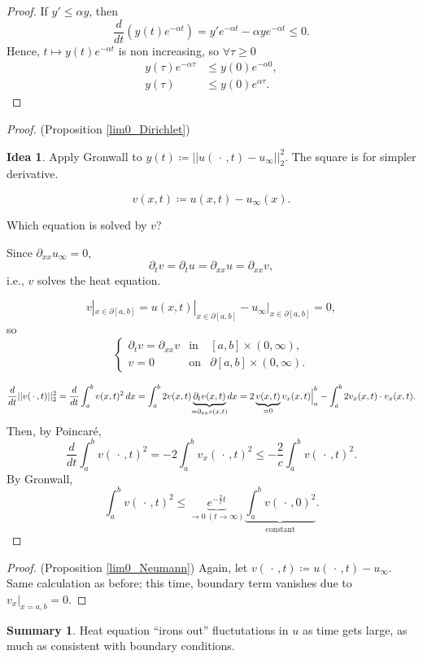 \documentclass[12pt]{article}
\theoremstyle{definition}
\newtheorem*{summary}{Summary}
\newtheorem*{idea}{Idea}
\begin{document}
\begin{proof}
If $y'\leq\alpha y$, then
\[\frac d{dt}(y(t)e^{-\alpha t})=y'e^{-\alpha t}-\alpha ye^{-\alpha t}\leq0.\]
Hence, $t\mapsto y(t)e^{-\alpha t}$ is non increasing, so $\forall\tau\geq0$
\begin{align*}
y(\tau)e^{-\alpha\tau}&\leq y(0)e^{-\alpha0},\\
y(\tau)&\leq y(0)e^{\alpha\tau}.
\end{align*}
\end{proof}

\begin{proof}
(Proposition \ref{lim0_Dirichlet})
\begin{idea}
Apply Gronwall to $y(t)\coloneqq||u(\,\cdot\,,t)-u_\infty||_2^2$. The square is for simpler derivative.
\end{idea}

\[v(x,t)\coloneqq u(x,t)-u_\infty(x).\]

Which equation is solved by $v$?

Since $\partial_{xx}u_\infty=0$,
\[\partial_tv=\partial_tu=\partial_{xx}u=\partial_{xx}v,\]
i.e., $v$ solves the heat equation.

\[v|_{x\in\partial[a,b]}=u(x,t)|_{x\in\partial[a,b]}-u_\infty|_{x\in\partial[a,b]}=0,\]
so
\[\left\{\begin{array}{ccc}\partial_tv=\partial_{xx}v&\text{in}&[a,b]\times(0,\infty),\\v=0&\text{on}&\partial[a,b]\times(0,\infty).\end{array}\right.\]

\[\frac d{dt}||v(\,\cdot\,,t)||_2^2=\frac d{dt}\int_a^bv(x,t)^2\,dx=\int_a^b2v(x,t)\underbrace{\partial_tv(x,t)}_{\mathclap{=\partial_{xx}v(x,t)}}dx=2\underbrace{v(x,t)}_{=0}v_x(x,t)\Big|_{a}^b-\int_a^b2v_x(x,t)\cdot v_x(x,t).\]
Then, by Poincar\'e,
\[\frac d{dt}\int_a^bv(\,\cdot\,,t)^2=-2\int_a^bv_x(\,\cdot\,,t)^2\leq-\frac2c\int_a^bv(\,\cdot\,,t)^2.\]
By Gronwall,
\[\int_a^bv(\,\cdot\,,t)^2\leq \underbrace{e^{-\frac2ct}}_{\to0\ (t\to\infty)}\underbrace{\int_a^bv(\,\cdot\,,0)^2}_{\text{constant}}.\]
\end{proof}

\begin{proof}
(Proposition \ref{lim0_Neumann}) Again, let $v(\,\cdot\,,t)\coloneqq u(\,\cdot\,,t)-u_\infty$. Same calculation as before; this time, boundary term vanishes due to $v_x|_{x=a,b}=0$.
\end{proof}

\begin{summary}
Heat equation ``irons out'' fluctutations in $u$ as time gets large, as much as consistent with boundary conditions.
\end{summary}
\end{document}
